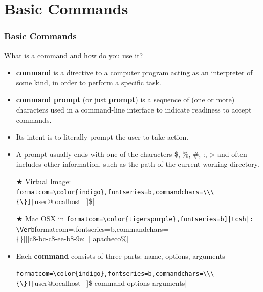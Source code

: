 \documentclass[c,compress,xcolor=svgnames]{beamer}
\newcommand{\Verbpurple}[1]{\Verb[formatcom=\color{tigerspurple},fontseries=b]|#1|}
\newenvironment{eblock}[0]
{
\begin{beamerboxesrounded}[upper=uppercol2,lower=lowercol2,shadow=true]}
{\end{beamerboxesrounded}}
\begin{document}
\section{Basic Commands}
\begin{frame}[fragile]
  \frametitle{\small Basic Commands}
  \begin{eblock}{What is a command and how do you use it?}
    \begin{itemize}
      \item \textbf{command} is a directive to a computer program acting as an interpreter of some kind, in order to perform a specific task.
      \item \textbf{command prompt} (or just \textbf{prompt}) is a sequence of (one or more) characters used in a command-line interface to indicate readiness to accept commands.
      \item Its intent is to literally prompt the user to take action. 
      \item A prompt usually ends with one of the characters \$, \%, \#, :, > and often includes other information, such as the path of the current working directory.
      \item[$\bigstar$] Virtual Image: \Verb[formatcom=\color{indigo},fontseries=b,commandchars=\\\{\}]|[user@localhost ~]\$|
      \item[$\bigstar$] Mac OSX in \Verbpurple{tcsh}: \Verb[formatcom=\color{indigo},fontseries=b,commandchars=\\\{\}]|[c8-bc-c8-ee-b8-9e:~] apacheco\%|
      \item Each \textbf{command} consists of three parts: name, options, arguments
      \item[] \Verb[formatcom=\color{indigo},fontseries=b,commandchars=\\\{\}]|[user@localhost ~]\$ command options arguments|
    \end{itemize}
  \end{eblock}
\end{frame}
\end{document}
